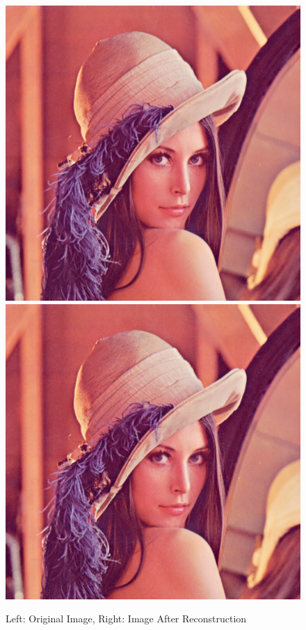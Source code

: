 \documentclass[12pt]{article}
\begin{document}
\begin{figure}[h]
\centerline{%
\includegraphics[scale=0.45]{"lena"}%
\hspace{0.1cm}
\includegraphics[scale=0.45]{"Lena Embed once 0.7 threshold/finalImageAfterRestoration"}%
}%
\caption{Left: Original Image, Right: Image After Reconstruction}
\label{fig:lenaEmbedOnceRestoredOriginal}
\end{figure}
\end{document}
